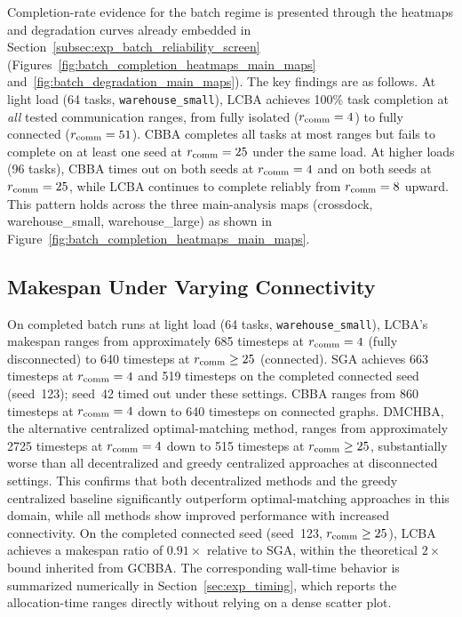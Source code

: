 Completion-rate evidence for the batch regime is presented through the
heatmaps and degradation curves already embedded in
Section~\ref{subsec:exp_batch_reliability_screen}
(Figures~\ref{fig:batch_completion_heatmaps_main_maps}
and~\ref{fig:batch_degradation_main_maps}).
The key findings are as follows.
At light load (64 tasks, \texttt{warehouse\_small}), LCBA achieves 100\%
task completion at \emph{all} tested communication ranges, from fully
isolated ($r_{\text{comm}} = 4$) to fully connected ($r_{\text{comm}} = 51$).
CBBA completes all tasks at most ranges but fails to complete on at least one
seed at $r_{\text{comm}} = 25$ under the same load.
At higher loads (96 tasks), CBBA times out on both seeds at $r_{\text{comm}} = 4$
and on both seeds at $r_{\text{comm}} = 25$, while LCBA continues to complete
reliably from $r_{\text{comm}} = 8$ upward.
This pattern holds across the three main-analysis maps
(crossdock, warehouse\_small, warehouse\_large) as shown in
Figure~\ref{fig:batch_completion_heatmaps_main_maps}.


\subsection{Makespan Under Varying Connectivity}
\label{subsec:exp_makespan_comm}

On completed batch runs at light load (64 tasks, \texttt{warehouse\_small}),
LCBA's makespan ranges from approximately 685 timesteps at $r_{\text{comm}} = 4$
(fully disconnected) to 640 timesteps at $r_{\text{comm}} \geq 25$ (connected).
SGA achieves 663 timesteps at $r_{\text{comm}} = 4$ and 519 timesteps on the completed
connected seed (seed~123); seed~42 timed out under these settings.
CBBA ranges from 860 timesteps at $r_{\text{comm}} = 4$ down to 640 timesteps on
connected graphs.
DMCHBA, the alternative centralized optimal-matching method, ranges from
approximately 2725 timesteps at $r_{\text{comm}} = 4$ down to 515 timesteps at
$r_{\text{comm}} \geq 25$, substantially worse than all decentralized and greedy
centralized approaches at disconnected settings.
This confirms that both decentralized methods and the greedy centralized
baseline significantly outperform optimal-matching approaches in this domain,
while all methods show improved performance with increased connectivity.
On the completed connected seed (seed~123, $r_{\text{comm}} \geq 25$), LCBA achieves a
makespan ratio of $0.91\times$ relative to SGA, within the theoretical $2\times$
bound inherited from GCBBA.
The corresponding wall-time behavior is summarized numerically in
Section~\ref{sec:exp_timing}, which reports the allocation-time ranges
directly without relying on a dense scatter plot.


